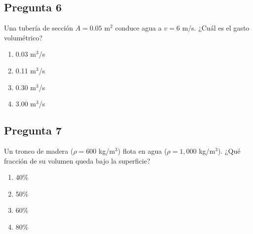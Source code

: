 \begin{preguntabox}
\subsection*{Pregunta 6}
Una tubería de sección $A = 0.05$ m$^2$ conduce agua a $v = 6$ m/s. ¿Cuál es el gasto volumétrico?

\begin{enumerate}
    \item[A)] 0.03 m$^3$/s
    \item[B)] 0.11 m$^3$/s
    \item[C)] 0.30 m$^3$/s
    \item[D)] 3.00 m$^3$/s
\end{enumerate}
\end{preguntabox}

\begin{preguntabox}
\subsection*{Pregunta 7}
Un tronco de madera ($\rho = 600$ kg/m$^3$) flota en agua ($\rho = 1{,}000$ kg/m$^3$). ¿Qué fracción de su volumen queda bajo la superficie?

\begin{enumerate}
    \item[A)] 40\%
    \item[B)] 50\%
    \item[C)] 60\%
    \item[D)] 80\%
\end{enumerate}
\end{preguntabox}

